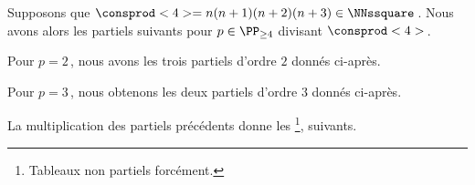 Supposons que $\consprod<4> = n(n+1)(n+2)(n+3) \in \NNssquare$\,. Nous avons alors les \sftab[x] partiels suivants pour $p \in \PP_{\geq 4}$ divisant $\consprod<4>$\,.

\begin{center}
\end{center}


Pour $p = 2$\,, nous avons les trois \sftab[x] partiels d'ordre $2$ donnés ci-après.

\begin{center}
\end{center}


Pour $p = 3$\,, nous obtenons les deux \sftab[x] partiels d'ordre $3$ donnés ci-après.

\begin{center}
\end{center}


La multiplication des \sftab[x] partiels précédents donne les \sftab[x]
\footnote{
	Tableaux non partiels forcément.
},
suivants.

